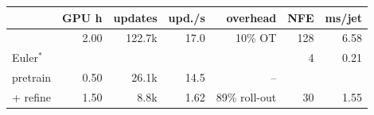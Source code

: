 \scriptsize
\setlength{\tabcolsep}{2.5pt}
\begin{tabular}{lrrrrrr}
\toprule
 & GPU h & updates & upd./s & overhead & NFE & ms/jet \\
\midrule
\ot{} & 2.00 & 122.7k & 17.0 & 10\% OT & 128 & 6.58 \\
\quad 4 Euler$^\ast$ & & & & & 4 & 0.21 \\
\dsbm{} pretrain & 0.50 & 26.1k & 14.5 & -- & & \\
\quad + refine & 1.50 & 8.8k & 1.62 & 89\% roll-out & 30 & 1.55 \\
\bottomrule
\end{tabular}
